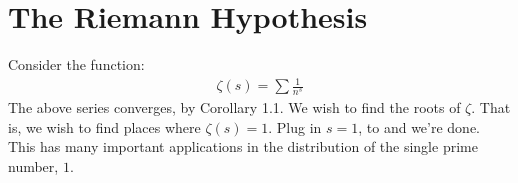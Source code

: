 \setcounter{section}{0}

\section{The Riemann Hypothesis}
Consider the function:
\begin{align*}
  \zeta(s) = \sum \frac{1}{n^s}
\end{align*}
The above series converges, by Corollary 1.1.
We wish to find the roots of $\zeta$. That is, 
we wish to find places where $\zeta(s) = 1$. Plug in $s=1$, 
to and we're done.
\vspace{0.5cm}\\
This has many important applications in 
the distribution of the single 
prime number, $1$.
